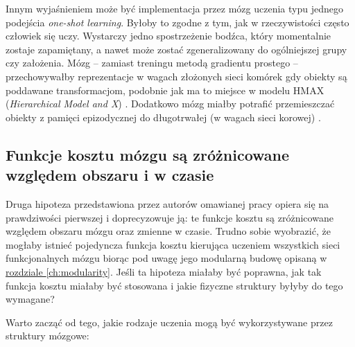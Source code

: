 Innym wyjaśnieniem może być implementacja przez mózg uczenia typu jednego podejścia \emph{one-shot learning}.
Byłoby to zgodne z tym, jak w rzeczywistości często człowiek się uczy.
Wystarczy jedno spostrzeżenie bodźca, który momentalnie zostaje zapamiętany, a nawet może zostać zgeneralizowany do ogólniejszej grupy czy założenia.
Mózg -- zamiast treningu metodą gradientu prostego -- przechowywałby reprezentacje w wagach złożonych sieci komórek gdy obiekty są poddawane transformacjom, podobnie jak ma to miejsce w modelu HMAX (\emph{Hierarchical Model and X}) \cite{serre2007feedforward}.
Dodatkowo mózg miałby potrafić przemieszczać obiekty z pamięci epizodycznej do długotrwałej (w wagach sieci korowej) \cite{ji2007coordinated}.

\subsection{Funkcje kosztu mózgu są zróżnicowane względem obszaru i w czasie}
\label{subsec:cost-function-is-diverse}

Druga hipoteza przedstawiona przez autorów omawianej pracy \cite{marblestone2016toward} opiera się na prawdziwości pierwszej i doprecyzowuje ją: te funkcje kosztu są zróżnicowane względem obszaru mózgu oraz zmienne w czasie.
Trudno sobie wyobrazić, że mogłaby istnieć pojedyncza funkcja kosztu kierująca uczeniem wszystkich sieci funkcjonalnych mózgu biorąc pod uwagę jego modularną budowę opisaną w \hyperref[ch:modularity]{rozdziale \ref*{ch:modularity}}.
Jeśli  ta hipoteza miałaby być poprawna, jak tak funkcja kosztu miałaby być stosowana i jakie fizyczne struktury byłyby do tego wymagane?

Warto zacząć od tego, jakie rodzaje uczenia mogą być wykorzystywane przez struktury mózgowe:


